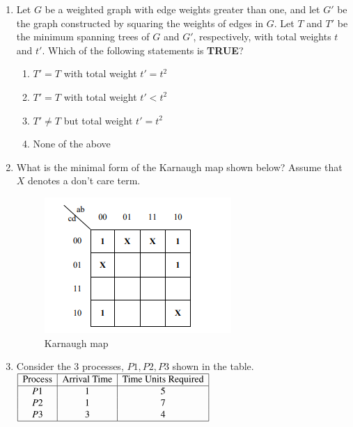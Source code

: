 \documentclass[journal]{IEEEtran}
\numberwithin{equation}{enumi}
\numberwithin{figure}{enumi}
\begin{document}
\begin{enumerate}
\item Let $G$ be a weighted graph with edge weights greater than one, and let $G'$ be the graph constructed by squaring the weights of edges in $G$.  
Let $T$ and $T'$ be the minimum spanning trees of $G$ and $G'$, respectively, with total weights $t$ and $t'$.  
Which of the following statements is \textbf{TRUE}?

\begin{enumerate}
    \item $T' = T$ with total weight $t' = t^2$
    \item $T' = T$ with total weight $t' < t^2$
    \item $T' \neq T$ but total weight $t' = t^2$
    \item None of the above
\end{enumerate}

\item What is the minimal form of the Karnaugh map shown below?  
Assume that $X$ denotes a don't care term.
\begin{figure}[H]
    \centering
    \includegraphics[width=0.5\columnwidth]{figs/New folder (2)/fig7.png}
    \caption{Karnaugh map}
    \label{fig:7}
   \end{figure}
\begin{enumerate}
\end{enumerate}

\item Consider the 3 processes, $P1, P2, P3$ shown in the table.
$
\begin{array}{|c|c|c|}
\hline
\text{Process} & \text{Arrival Time} & \text{Time Units Required} \\
\hline
P1 & 1 & 5 \\
P2 & 1 & 7 \\
P3 & 3 & 4 \\
\hline
\end{array}
$


\end{enumerate}
\end{document}

